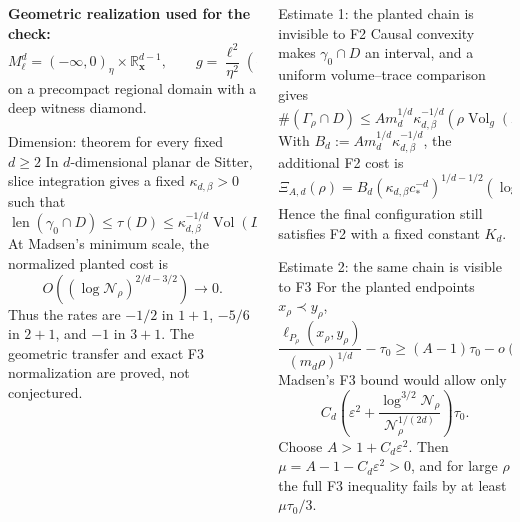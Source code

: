 \documentclass[final]{beamer}
\newcommand{\tightdisplay}[1]{\vspace{-1mm}\[#1\]\vspace{-2mm}}
\begin{document}
\begin{frame}[t]
\begin{columns}[T,totalwidth=\textwidth]
\begin{column}{0.319\textwidth}
\begin{scopebox}
  \textbf{Geometric realization used for the check:}
  \tightdisplay{
    M_\ell^d=(-\infty,0)_\eta\times\mathbb R^{d-1}_{\mathbf x},
    \qquad g=\frac{\ell^2}{\eta^2}(-d\eta^2+d\mathbf x^2)
  }
  on a precompact regional domain with a deep witness diamond.
\end{scopebox}

\begin{posterbox}{Dimension: theorem for every fixed \(d\ge2\)}
  In \(d\)-dimensional planar de Sitter, slice integration gives a fixed
  \(\kappa_{d,\beta}>0\) such that
  \tightdisplay{
    \operatorname{len}(\gamma_0\cap D)\le\tau(D)
    \le\kappa_{d,\beta}^{-1/d}\operatorname{Vol}(D)^{1/d}.
  }
  At Madsen's minimum scale, the normalized planted cost is
  \tightdisplay{
    O\!\left((\log\mathcal N_\rho)^{2/d-3/2}\right)\to0.
  }
  Thus the rates are \(-1/2\) in \(1+1\), \(-5/6\) in \(2+1\), and \(-1\) in
  \(3+1\). The geometric transfer and exact F3 normalization are proved, not conjectured.
\end{posterbox}

\end{column}

\hfill

\begin{column}{0.345\textwidth}

\begin{posterbox}{Estimate 1: the planted chain is invisible to F2}
  Causal convexity makes \(\gamma_0\cap D\) an interval, and a uniform volume--trace comparison gives
  \tightdisplay{
    \#(\Gamma_\rho\cap D)
    \le A m_d^{1/d}\kappa_{d,\beta}^{-1/d}
       (\rho\operatorname{Vol}_g(D))^{1/d}+2.
  }
  With \(B_d:=A m_d^{1/d}\kappa_{d,\beta}^{-1/d}\), the additional F2 cost is
  \tightdisplay{
    \Xi_{A,d}(\rho)=
    B_d(\kappa_{d,\beta}c_*^{-d})^{1/d-1/2}
       (\log\mathcal N_\rho)^{2/d-3/2}
    +O((\log\mathcal N_\rho)^{-3/2})
    \longrightarrow0.
  }
  Hence the final configuration still satisfies F2 with a fixed constant \(K_d\).
\end{posterbox}

\begin{posterbox}{Estimate 2: the same chain is visible to F3}
  For the planted endpoints \(x_\rho\prec y_\rho\),
  \tightdisplay{
    \frac{\ell_{P_\rho}(x_\rho,y_\rho)}{(m_d\rho)^{1/d}}-\tau_0
    \ge(A-1)\tau_0-o(1).
  }
  Madsen's F3 bound would allow only
  \tightdisplay{
    C_d\!\left(\varepsilon^2+
      \frac{\log^{3/2}\mathcal N_\rho}{\mathcal N_\rho^{1/(2d)}}\right)\tau_0.
  }
  Choose \(A>1+C_d\varepsilon^2\). Then
  \(\mu=A-1-C_d\varepsilon^2>0\), and for large \(\rho\) the full F3 inequality fails by at least
  \(\mu\tau_0/3\).
\end{posterbox}


\end{column}
\end{columns}
\end{frame}
\end{document}
